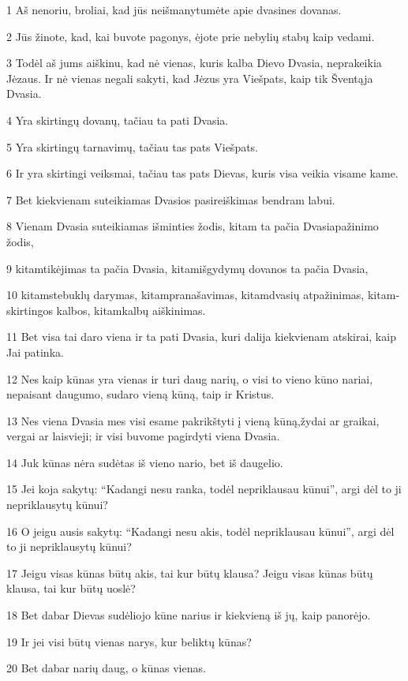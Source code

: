 \par 1 Aš nenoriu, broliai, kad jūs neišmanytumėte apie dvasines dovanas. 
\par 2 Jūs žinote, kad, kai buvote pagonys, ėjote prie nebylių stabų kaip vedami. 
\par 3 Todėl aš jums aiškinu, kad nė vienas, kuris kalba Dievo Dvasia, neprakeikia Jėzaus. Ir nė vienas negali sakyti, kad Jėzus yra Viešpats, kaip tik Šventąja Dvasia. 
\par 4 Yra skirtingų dovanų, tačiau ta pati Dvasia. 
\par 5 Yra skirtingų tarnavimų, tačiau tas pats Viešpats. 
\par 6 Ir yra skirtingi veiksmai, tačiau tas pats Dievas, kuris visa veikia visame kame. 
\par 7 Bet kiekvienam suteikiamas Dvasios pasireiškimas bendram labui. 
\par 8 Vienam Dvasia suteikiamas išminties žodis, kitam ta pačia Dvasia­pažinimo žodis, 
\par 9 kitam­tikėjimas ta pačia Dvasia, kitam­išgydymų dovanos ta pačia Dvasia, 
\par 10 kitam­stebuklų darymas, kitam­pranašavimas, kitam­dvasių atpažinimas, kitam­skirtingos kalbos, kitam­kalbų aiškinimas. 
\par 11 Bet visa tai daro viena ir ta pati Dvasia, kuri dalija kiekvienam atskirai, kaip Jai patinka. 
\par 12 Nes kaip kūnas yra vienas ir turi daug narių, o visi to vieno kūno nariai, nepaisant daugumo, sudaro vieną kūną, taip ir Kristus. 
\par 13 Nes viena Dvasia mes visi esame pakrikštyti į vieną kūną,­žydai ar graikai, vergai ar laisvieji; ir visi buvome pagirdyti viena Dvasia. 
\par 14 Juk kūnas nėra sudėtas iš vieno nario, bet iš daugelio. 
\par 15 Jei koja sakytų: “Kadangi nesu ranka, todėl nepriklausau kūnui”, argi dėl to ji nepriklausytų kūnui? 
\par 16 O jeigu ausis sakytų: “Kadangi nesu akis, todėl nepriklausau kūnui”, argi dėl to ji nepriklausytų kūnui? 
\par 17 Jeigu visas kūnas būtų akis, tai kur būtų klausa? Jeigu visas kūnas būtų klausa, tai kur būtų uoslė? 
\par 18 Bet dabar Dievas sudėliojo kūne narius ir kiekvieną iš jų, kaip panorėjo. 
\par 19 Ir jei visi būtų vienas narys, kur beliktų kūnas? 
\par 20 Bet dabar narių daug, o kūnas vienas. 
